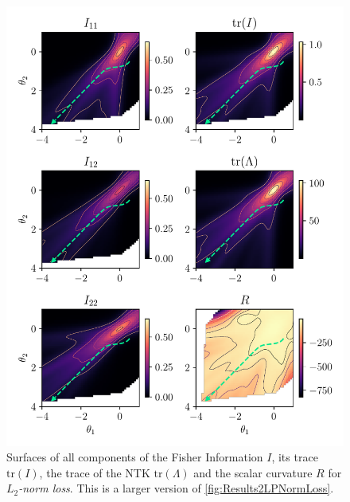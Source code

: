 \begin{figure}
	\centering
	\includegraphics{Experiment2/plots/LPNormLoss2_tracecomparison_Big.pdf}
	\caption{Surfaces of all components of the Fisher Information $I$, its trace $\mathrm{tr}(I)$, the trace of the NTK $\mathrm{tr}(\Lambda)$ and the scalar curvature $R$ for \emph{$L_2$-norm loss}. This is a larger version of \cref{fig:Results2LPNormLoss}.}
	\label{fig:Results2LPNormLossBig}
\end{figure}


